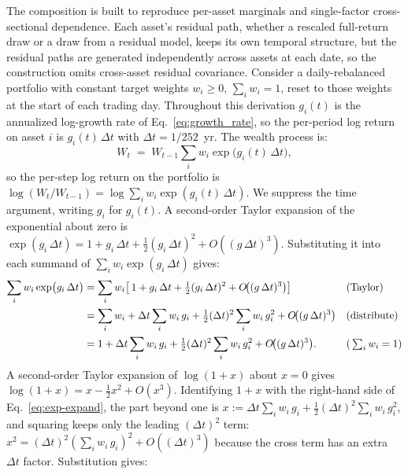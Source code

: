 The composition is built to reproduce per-asset marginals and
single-factor cross-sectional dependence. Each asset's residual path,
whether a rescaled full-return draw or a draw from a residual model,
keeps its own temporal structure, but the residual paths are generated
independently across assets at each date, so the construction omits
cross-asset residual covariance. Consider a daily-rebalanced portfolio
with constant target weights $w_i \ge 0$, $\sum_i w_i = 1$,
reset to those weights at the start of each trading day. Throughout
this derivation $g_i(t)$ is the annualized log-growth rate of
Eq.~\eqref{eq:growth_rate}, so the per-period log return on asset
$i$ is $g_i(t)\,\Delta t$ with $\Delta t = 1/252$~yr. The wealth
process is:
\begin{equation}
  W_t \;=\; W_{t-1} \sum_{i} w_i \exp\!\big(g_i(t)\,\Delta t\big),
  \label{eq:wealth-recursion}
\end{equation}
so the per-step log return on the portfolio is
$\log(W_t/W_{t-1}) = \log\!\sum_i w_i \exp(g_i(t)\,\Delta t)$. We
suppress the time argument, writing $g_i$ for $g_i(t)$. A
second-order Taylor expansion of the exponential about zero is
$\exp(g_i\,\Delta t) = 1 + g_i\,\Delta t + \tfrac{1}{2}(g_i\,\Delta t)^2
+ O((g\,\Delta t)^3)$. Substituting it into each summand of
$\sum_i w_i \exp(g_i\,\Delta t)$ gives:
\begin{align}
  \sum_{i} w_i \exp\!\big(g_i\,\Delta t\big)
   &= \sum_{i} w_i \!\left[\,1 + g_i\,\Delta t
        + \tfrac{1}{2}(g_i\,\Delta t)^2
        + O\!\big((g\,\Delta t)^3\big)\right]
       && \text{(Taylor)} \notag \\
   &= \sum_{i} w_i
        + \Delta t \sum_{i} w_i\, g_i
        + \tfrac{1}{2}(\Delta t)^2 \sum_{i} w_i\, g_i^2
        + O\!\big((g\,\Delta t)^3\big)
       && \text{(distribute)} \notag \\
   &= 1 + \Delta t \sum_{i} w_i\, g_i
        + \tfrac{1}{2}(\Delta t)^2 \sum_{i} w_i\, g_i^2
        + O\!\big((g\,\Delta t)^3\big).
       && \text{(}\textstyle\sum_i w_i = 1\text{)}
  \label{eq:exp-expand}
\end{align}
A second-order Taylor expansion of $\log(1+x)$ about $x=0$ gives
$\log(1+x) = x - \tfrac{1}{2}x^2 + O(x^3)$. Identifying $1 + x$ with
the right-hand side of Eq.~\eqref{eq:exp-expand}, the part beyond one
is
$x :=\Delta t \sum_i w_i\, g_i + \tfrac{1}{2}(\Delta t)^2 \sum_i w_i\, g_i^2$,
and squaring keeps only the leading $(\Delta t)^2$ term:
$x^2 = (\Delta t)^2 (\sum_i w_i\, g_i)^2 + O((\Delta t)^3)$ because
the cross term has an extra $\Delta t$ factor. Substitution gives:
